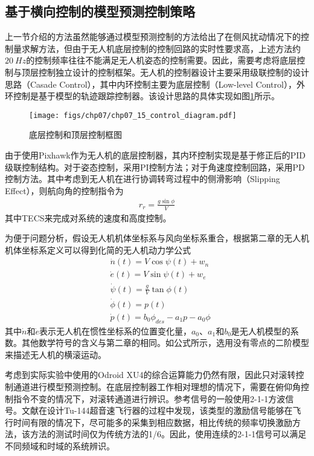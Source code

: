 \subsection{基于横向控制的模型预测控制策略}

上一节介绍的方法虽然能够通过模型预测控制的方法给出了在侧风扰动情况下的控制量求解方法，但由于无人机底层控制的控制回路的实时性要求高，上述方法约$20\ Hz$的控制频率往往不能满足无人机姿态的控制需要。因此，需要考虑将底层控制与顶层控制独立设计的控制框架。无人机的控制器设计主要采用级联控制的设计思路（Casade Control），其中内环控制主要为底层控制（Low-level Control），外环控制是基于模型的轨迹跟踪控制器。该设计思路的具体实现如图\ref{fig:chp07_15_control_diagram}所示。
 
\begin{figure}[ht]   
\centering
\texttt{[image: figs/chp07/chp07\_15\_control\_diagram.pdf]}
\caption{底层控制和顶层控制框图}
\label{fig:chp07_15_control_diagram}
\end{figure}

由于使用Pixhawk作为无人机的底层控制器，其内环控制实现是基于修正后的PID级联控制结构。对于姿态控制，采用PI控制方法；对于角速度控制回路，采用PD控制方法。其中考虑到无人机在进行协调转弯过程中的侧滑影响（Slipping Effect），则航向角的控制指令为
\begin{align}
r_r=\frac{g\sin\phi}{V}
\end{align}
其中TECS来完成对系统的速度和高度控制。

为便于问题分析，假设无人机机体坐标系与风向坐标系重合，根据第二章的无人机机体坐标系定义可以得到化简的无人机动力学公式
\begin{align}
&\dot{n}(t) = V\cos \psi(t) + w_n \\
&\dot{e}(t) = V\sin \psi(t) + w_e \\
&\dot{\psi}(t) = \frac{g}{V}\tan\phi(t) \\
&\dot{\phi}(t) = p(t) \\
&\dot{p}(t) = b_0\phi_{des}-a_1p-a_0\phi \label{eq:roll_s_function}
\end{align}
其中$\dot{n}$和$\dot{e}$表示无人机在惯性坐标系的位置变化量，$a_0$、$a_1$和$b_0$是无人机模型的系数。其他数学符号的含义与第二章的相同。如公式所示，选用没有零点的二阶模型来描述无人机的横滚运动。

考虑到实际实验中使用的Odroid XU4的综合运算能力仍然有限，因此只对滚转控制通道进行模型预测控制。在底层控制器工作相对理想的情况下，需要在俯仰角控制指令不变的情况下，对滚转通道进行辨识。参考信号的一般使用2-1-1方波信号。文献\cite{morelli2003low}在设计Tu-144超音速飞行器的过程中发现，该类型的激励信号能够在飞行时间有限的情况下，尽可能多的采集到相应数据，相比传统的频率切换激励方法，该方法的测试时间仅为传统方法的1/6。因此，使用连续的2-1-1信号可以满足不同频域和时域的系统辨识。

